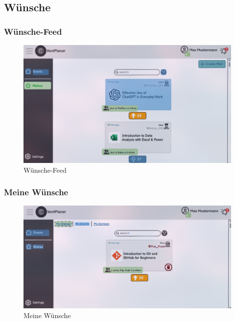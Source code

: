 \documentclass[a4paper,12pt]{article}
\begin{document}
\subsection{Wünsche}
\subsubsection{Wünsche-Feed}
\begin{figure}[H]
    \centering
    \includegraphics[width=1\textwidth]{Abbildungen/wishes/wishes-feed.png}
    \caption{Wünsche-Feed}
    \label{fig:wishes-feed}
\end{figure}

\subsubsection{Meine Wünsche}
\begin{figure}[H]
    \centering
    \includegraphics[width=1\textwidth]{Abbildungen/wishes/my-wishes.png}
    \caption{Meine Wünsche}
    \label{fig:my-wishes}
\end{figure}
\end{document}
